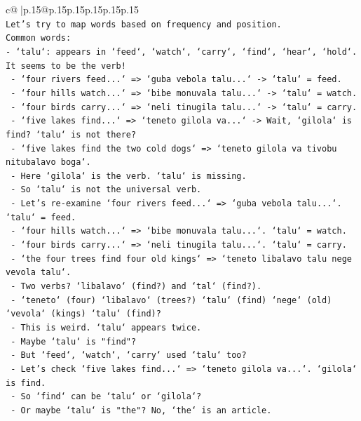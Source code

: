 \documentclass{article}
\begin{document}
{\begin{supertabular}{c@{$\;$}|p{.15\linewidth}@{}p{.15\linewidth}p{.15\linewidth}p{.15\linewidth}p{.15\linewidth}p{.15\linewidth}}
{{{\\ 
\texttt{Let's try to map words based on frequency and position.} \\
\texttt{Common words:} \\
\texttt{{-} `talu`: appears in `feed`, `watch`, `carry`, `find`, `hear`, `hold`. It seems to be the verb!} \\
\texttt{  {-} `four rivers feed...` => `guba vebola talu...` {-}> `talu` = feed.} \\
\texttt{  {-} `four hills watch...` => `bibe monuvala talu...` {-}> `talu` = watch.} \\
\texttt{  {-} `four birds carry...` => `neli tinugila talu...` {-}> `talu` = carry.} \\
\texttt{  {-} `five lakes find...` => `teneto gilola va...` {-}> Wait, `gilola` is find? `talu` is not there?} \\
\texttt{    {-} `five lakes find the two cold dogs` => `teneto gilola va tivobu nitubalavo boga`.} \\
\texttt{    {-} Here `gilola` is the verb. `talu` is missing.} \\
\texttt{    {-} So `talu` is not the universal verb.} \\
\texttt{    {-} Let's re{-}examine `four rivers feed...` => `guba vebola talu...`. `talu` = feed.} \\
\texttt{    {-} `four hills watch...` => `bibe monuvala talu...`. `talu` = watch.} \\
\texttt{    {-} `four birds carry...` => `neli tinugila talu...`. `talu` = carry.} \\
\texttt{    {-} `the four trees find four old kings` => `teneto libalavo talu nege vevola talu`.} \\
\texttt{      {-} Two verbs? `libalavo` (find?) and `tal` (find?).} \\
\texttt{      {-} `teneto` (four) `libalavo` (trees?) `talu` (find) `nege` (old) `vevola` (kings) `talu` (find)?} \\
\texttt{      {-} This is weird. `talu` appears twice.} \\
\texttt{      {-} Maybe `talu` is "find"?} \\
\texttt{      {-} But `feed`, `watch`, `carry` used `talu` too?} \\
\texttt{      {-} Let's check `five lakes find...` => `teneto gilola va...`. `gilola` is find.} \\
\texttt{      {-} So `find` can be `talu` or `gilola`?} \\
\texttt{      {-} Or maybe `talu` is "the"? No, `the` is an article.} \\
}}}
\end{supertabular}}
\end{document}
